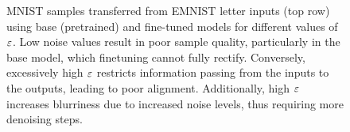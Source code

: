 \documentclass{article}
\begin{document}
\begin{figure}[bt]
\centering
{}\hfill
{}
\caption{MNIST samples transferred from EMNIST letter inputs (top row) using base (pretrained) and fine-tuned models for different values of $\varepsilon$. Low noise values result in poor sample quality, particularly in the base model, which finetuning cannot fully rectify.  Conversely, excessively high $\varepsilon$ restricts information passing from the inputs to the outputs, leading to poor alignment. Additionally, high $\varepsilon$ increases blurriness due to increased noise levels, thus requiring more denoising steps.
}
\label{fig:mnist_sigma_sweep_samples}
\end{figure}
\end{document}

